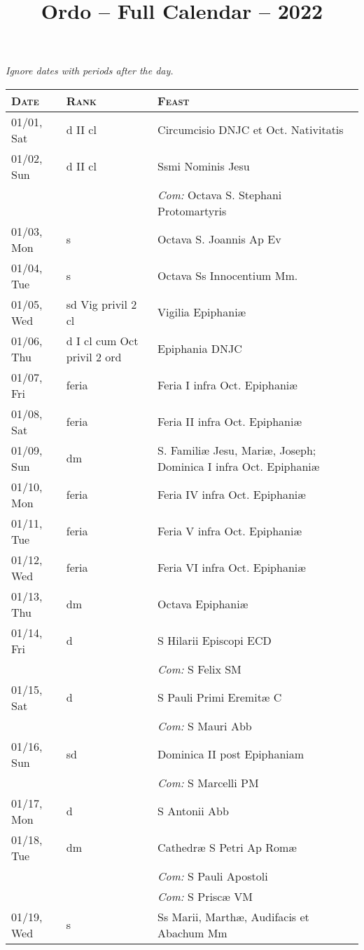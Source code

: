 \documentclass[10pt]{article}
\title{Ordo -- Full Calendar -- 2022}
\begin{document}
\textit{\centering\footnotesize Ignore dates with periods after the day.}
\begin{longtable}{ l l l }
\hline
\textsc{Date} & \textsc{Rank} & \textsc{Feast} \\
\hline
\endhead
01/01, Sat & d II cl & Circumcisio DNJC et Oct. Nativitatis\\
01/02, Sun & d II cl & Ssmi Nominis Jesu\\
 & & \textit{Com:} Octava S. Stephani Protomartyris\\
01/03, Mon & s & Octava S. Joannis Ap Ev\\
01/04, Tue & s & Octava Ss Innocentium Mm.\\
01/05, Wed & sd Vig privil 2 cl & Vigilia Epiphaniæ\\
01/06, Thu & d I cl cum Oct privil 2 ord & Epiphania DNJC\\
01/07, Fri & feria & Feria I infra Oct. Epiphaniæ\\
01/08, Sat & feria & Feria II infra Oct. Epiphaniæ\\
01/09, Sun & dm & S. Familiæ Jesu, Mariæ, Joseph; Dominica I infra Oct. Epiphaniæ\\
01/10, Mon & feria & Feria IV infra Oct. Epiphaniæ\\
01/11, Tue & feria & Feria V infra Oct. Epiphaniæ\\
01/12, Wed & feria & Feria VI infra Oct. Epiphaniæ\\
01/13, Thu & dm & Octava Epiphaniæ\\
01/14, Fri & d & S Hilarii Episcopi ECD\\
 & & \textit{Com:} S Felix SM\\
01/15, Sat & d & S Pauli Primi Eremitæ C\\
 & & \textit{Com:} S Mauri Abb\\
01/16, Sun & sd & Dominica II post Epiphaniam\\
 & & \textit{Com:} S Marcelli PM\\
01/17, Mon & d & S Antonii Abb\\
01/18, Tue & dm & Cathedræ S Petri Ap Romæ\\
 & & \textit{Com:} S Pauli Apostoli\\
 & & \textit{Com:} S Priscæ VM\\
01/19, Wed & s & Ss Marii, Marthæ, Audifacis et Abachum Mm\\

\end{longtable}
\end{document}

